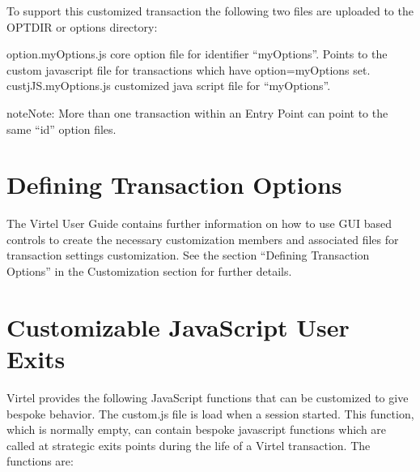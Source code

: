 \documentclass[letterpaper,10pt,english]{sphinxmanual}
\begin{document}
\sphinxAtStartPar
{}

\sphinxAtStartPar
To support this customized transaction the following two files are uploaded to the OPT\sphinxhyphen{}DIR or options directory:
\begin{description}
\sphinxlineitem{::}
\sphinxAtStartPar
option.myOptions.js  \sphinxhyphen{} core option file for identifier “myOptions”. Points to the custom javascript file for transactions which have option=myOptions set.
custjJS.myOptions.js \sphinxhyphen{} customized java script file for “myOptions”.

\end{description}

\begin{sphinxadmonition}{note}{Note:}
\sphinxAtStartPar
More than one transaction within an Entry Point can point to the same “id” option files.
\end{sphinxadmonition}

\ignorespaces 

\section{Defining Transaction Options}
\label{\detokenize{Customization:defining-transaction-options}}\label{\detokenize{Customization:index-6}}
\sphinxAtStartPar
The Virtel User Guide contains further information on how to use GUI based controls to create the necessary customization members and associated files for transaction settings customization. See the section “Defining Transaction Options” in the Customization section for further details.

\ignorespaces 

\section{Customizable JavaScript User Exits}
\label{\detokenize{Customization:customizable-javascript-user-exits}}\label{\detokenize{Customization:index-7}}
\sphinxAtStartPar
Virtel provides the following JavaScript functions that can be customized to give bespoke behavior. The custom.js file is load when a session started. This function, which is normally empty, can contain bespoke javascript functions which are called at strategic exits points during the life of a Virtel transaction. The functions are:
\end{document}
